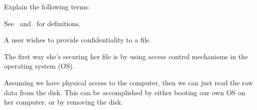 \documentclass[a4paper,addpoints]{exam}
\begin{document}
\begin{questions}
  \question\label{q:crypto:foundations:E}
  Explain the following terms:

  \begin{solution}
    See~\cite{Gollmann2011cs} and~\cite{Anderson2008sea} for definitions.
  \end{solution}


  \question\label{q:trustcomp:crypto:E:C}
  A user wishes to provide confidentiality to a file.

  \begin{solution}
    The first way she's securing her file is by using access control mechanisms 
    in the operating system (OS).

    Assuming we have physical access to the computer, then we can just read the 
    raw data from the disk.
    This can be accomplished by either booting our own OS on her computer, or 
    by removing the disk.


\end{solution}
\end{questions}
\end{document}
